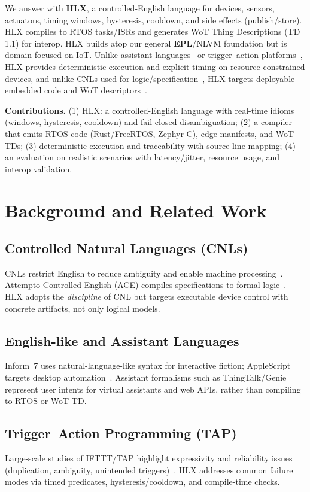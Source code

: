 \documentclass[journal]{IEEEtran}
\begin{document}
We answer with \textbf{HLX}, a controlled-English language for devices, sensors, actuators, timing windows, hysteresis, cooldown, and side effects (publish/store). HLX compiles to RTOS tasks/ISRs and generates WoT Thing Descriptions (TD 1.1) for interop. HLX builds atop our general \textbf{EPL}/NLVM foundation but is domain-focused on IoT. Unlike assistant languages~\cite{ThingTalk22,GeniePLDI19} or trigger–action platforms~\cite{UrIFTTT16,BrackenburyTAP19}, HLX provides deterministic execution and explicit timing on resource-constrained devices, and unlike CNLs used for logic/specification~\cite{KuhnCNL14,ACEManual}, HLX targets deployable embedded code and WoT descriptors~\cite{WoT11}.

\textbf{Contributions.} (1) HLX: a controlled-English language with real-time idioms (windows, hysteresis, cooldown) and fail-closed disambiguation; (2) a compiler that emits RTOS code (Rust/FreeRTOS, Zephyr C), edge manifests, and WoT TDs; (3) deterministic execution and traceability with source-line mapping; (4) an evaluation on realistic scenarios with latency/jitter, resource usage, and interop validation.

\section{Background and Related Work}
\subsection{Controlled Natural Languages (CNLs)}
CNLs restrict English to reduce ambiguity and enable machine processing~\cite{KuhnCNL14}. Attempto Controlled English (ACE) compiles specifications to formal logic~\cite{ACEManual}. HLX adopts the \emph{discipline} of CNL but targets executable device control with concrete artifacts, not only logical models.

\subsection{English-like and Assistant Languages}
Inform~7 uses natural-language-like syntax for interactive fiction; AppleScript targets desktop automation~\cite{InformSite,AppleScriptGuide}. Assistant formalisms such as ThingTalk/Genie~\cite{ThingTalk22,GeniePLDI19} represent user intents for virtual assistants and web APIs, rather than compiling to RTOS or WoT TD.

\subsection{Trigger–Action Programming (TAP)}
Large-scale studies of IFTTT/TAP highlight expressivity and reliability issues (duplication, ambiguity, unintended triggers)~\cite{UrIFTTT16,BrackenburyTAP19}. HLX addresses common failure modes via timed predicates, hysteresis/cooldown, and compile-time checks.
\end{document}

